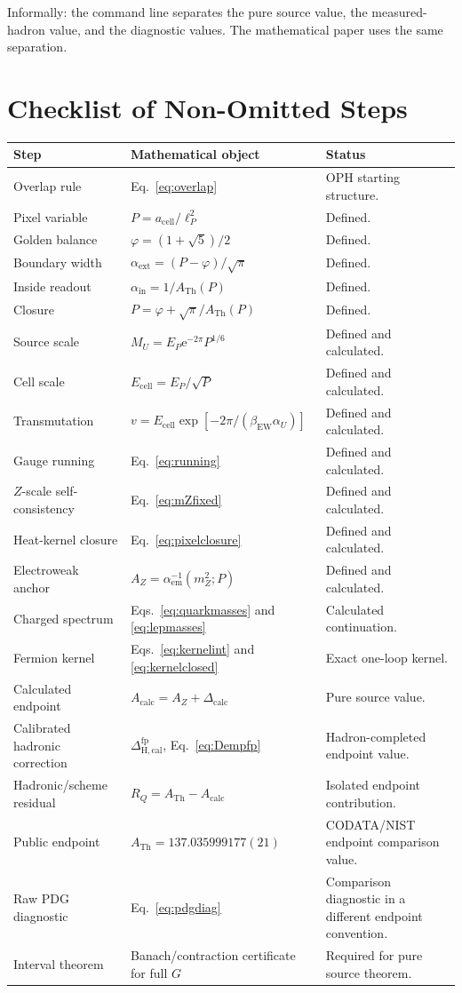 \documentclass[11pt]{article}
\theoremstyle{remark}
\newcommand{\e}{\mathrm e}
\newcommand{\ATh}{A_{\mathrm{Th}}}
\newcommand{\AZ}{A_Z}
\newcommand{\Rq}{R_Q}
\newcommand{\Dcalc}{\Delta_{\mathrm{calc}}}
\newcommand{\Dcalib}{\Delta_{\mathrm{H,cal}}}
\begin{document}
Informally: the command line separates the pure source value, the measured-hadron value, and the diagnostic values. The mathematical paper uses the same separation.

\section{Checklist of Non-Omitted Steps}

\begin{longtable}{@{}L{0.18\textwidth}L{0.44\textwidth}L{0.28\textwidth}@{}}
\toprule
Step & Mathematical object & Status \\
\midrule
\endhead
Overlap rule & Eq.~\eqref{eq:overlap} & OPH starting structure. \\
Pixel variable & \(P=a_{\mathrm{cell}}/\ell_P^2\) & Defined. \\
Golden balance & \(\varphi=(1+\sqrt5)/2\) & Defined. \\
Boundary width & \(\alpha_{\mathrm{ext}}=(P-\varphi)/\sqrt\pi\) & Defined. \\
Inside readout & \(\alpha_{\mathrm{in}}=1/\ATh(P)\) & Defined. \\
Closure & \(P=\varphi+\sqrt\pi/\ATh(P)\) & Defined. \\
Source scale & \(M_U=E_P\e^{-2\pi}P^{1/6}\) & Defined and calculated. \\
Cell scale & \(E_{\mathrm{cell}}=E_P/\sqrt P\) & Defined and calculated. \\
Transmutation & \(v=E_{\mathrm{cell}}\exp[-2\pi/(\beta_{\mathrm{EW}}\alpha_U)]\) & Defined and calculated. \\
Gauge running & Eq.~\eqref{eq:running} & Defined and calculated. \\
\(Z\)-scale self-consistency & Eq.~\eqref{eq:mZfixed} & Defined and calculated. \\
Heat-kernel closure & Eq.~\eqref{eq:pixelclosure} & Defined and calculated. \\
Electroweak anchor & \(\AZ=\alpha_{\mathrm{em}}^{-1}(m_Z^2;P)\) & Defined and calculated. \\
Charged spectrum & Eqs.~\eqref{eq:quarkmasses} and \eqref{eq:lepmasses} & Calculated continuation. \\
Fermion kernel & Eqs.~\eqref{eq:kernelint} and \eqref{eq:kernelclosed} & Exact one-loop kernel. \\
Calculated endpoint & \(A_{\mathrm{calc}}=\AZ+\Dcalc\) & Pure source value. \\
Calibrated hadronic correction & \(\Dcalib^{\mathrm{fp}}\), Eq.~\eqref{eq:Dempfp} & Hadron-completed endpoint value. \\
Hadronic/scheme residual & \(\Rq=\ATh-A_{\mathrm{calc}}\) & Isolated endpoint contribution. \\
Public endpoint & \(\ATh=137.035999177(21)\) & CODATA/NIST endpoint comparison value. \\
Raw PDG diagnostic & Eq.~\eqref{eq:pdgdiag} & Comparison diagnostic in a different endpoint convention. \\
Interval theorem & Banach/contraction certificate for full \(G\) & Required for pure source theorem. \\
\bottomrule
\end{longtable}
\end{document}
